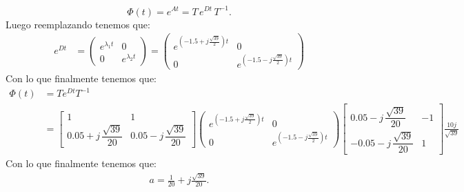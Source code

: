 \documentclass[
  11pt,
  letterpaper,
   addpoints,
   answers
  ]{exam}
\begin{document}
\begin{solution}
\begin{equation}
\Phi(t)=e^{At}=T\,e^{Dt}\,T^{-1}.
\end{equation}
Luego reemplazando tenemos que:
\begin{align}
  e^{Dt} &= \begin{pmatrix} e^{\lambda_1 t} & 0 \\ 0 & e^{\lambda_2 t} \end{pmatrix} = \begin{pmatrix} e^{(-1.5 + j\frac{\sqrt{39}}{2})t} & 0 \\ 0 & e^{(-1.5 - j\frac{\sqrt{39}}{2})t} \end{pmatrix}
\end{align}
Con lo que finalmente tenemos que:
\begin{align}
  \Phi(t) &= T e^{Dt} T^{-1} \\
  &= \begin{bmatrix}
    1 & 1\\
    0.05+j\,\dfrac{\sqrt{39}}{20} & 0.05-j\,\dfrac{\sqrt{39}}{20}
  \end{bmatrix}
  \begin{pmatrix}
    e^{(-1.5 + j\frac{\sqrt{39}}{2})t} & 0 \\
    0 & e^{(-1.5 - j\frac{\sqrt{39}}{2})t}
  \end{pmatrix}
  \begin{bmatrix}
    0.05-j\,\dfrac{\sqrt{39}}{20} & -1\\
    -0.05-j\,\dfrac{\sqrt{39}}{20} & 1
  \end{bmatrix} \frac{10j}{\sqrt{39}} 
\end{align}
Con lo que finalmente tenemos que:
\begin{align}
a=\frac{1}{20}+j\frac{\sqrt{39}}{20}.
\end{align}


\end{solution}
\end{document}
